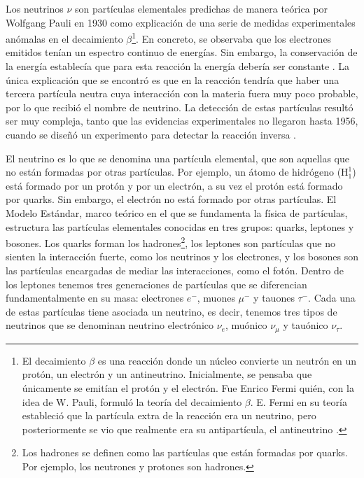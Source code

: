 \documentclass[a4paper,12pt,oneside,titlepage]{book}
\begin{document}
Los neutrinos $\nu$ son partículas elementales predichas de manera teórica por Wolfgang Pauli en 1930 \cite{neutrino_his} como explicación de una serie de medidas experimentales anómalas en el decaimiento $\beta$\footnote{El decaimiento $\beta$ es una reacción donde un núcleo convierte un neutrón en un protón, un electrón y un antineutrino. Inicialmente, se pensaba que únicamente se emitían el protón y el electrón. Fue Enrico Fermi quién, con la idea de W. Pauli, formuló la teoría del decaimiento $\beta$. E. Fermi en su teoría estableció que la partícula extra de la reacción era un neutrino, pero posteriormente se vio que realmente era su antipartícula, el antineutrino \cite{particle_griff}.}. En concreto, se observaba que los electrones emitidos tenían un espectro continuo de energías. Sin embargo, la conservación de la energía establecía que para esta reacción la energía debería ser constante \cite{particle_griff}. La única explicación que se encontró es que en la reacción tendría que haber una tercera partícula neutra cuya interacción con la materia fuera muy poco probable, por lo que recibió el nombre de neutrino. La detección de estas partículas resultó ser muy compleja, tanto que las evidencias experimentales no llegaron hasta 1956, cuando se diseñó un experimento para detectar la reacción inversa \cite{particle_griff}.

El neutrino es lo que se denomina una partícula elemental, que son aquellas que no están formadas por otras partículas. Por ejemplo, un átomo de hidrógeno ($\text{H}^1_1$) está formado por un protón y por un electrón, a su vez el protón está formado por quarks. Sin embargo, el electrón no está formado por otras partículas. El Modelo Estándar, marco teórico en el que se fundamenta la física de partículas, estructura las partículas elementales conocidas en tres grupos: quarks, leptones y bosones. Los quarks forman los hadrones\footnote{Los hadrones se definen como las partículas que están formadas por quarks. Por ejemplo, los neutrones y protones son hadrones.}, los leptones son partículas que no sienten la interacción fuerte, como los neutrinos y los electrones, y los bosones son las partículas encargadas de mediar las interacciones, como el fotón.
Dentro de los leptones tenemos tres generaciones de partículas que se diferencian fundamentalmente en su masa: electrones $e^-$, muones $\mu^-$ y tauones $\tau^-$. Cada una de estas partículas tiene asociada un neutrino, es decir, tenemos tres tipos de neutrinos que se denominan neutrino electrónico $\nu_e$, muónico $\nu_\mu$ y tauónico $\nu_\tau$.
\end{document}
